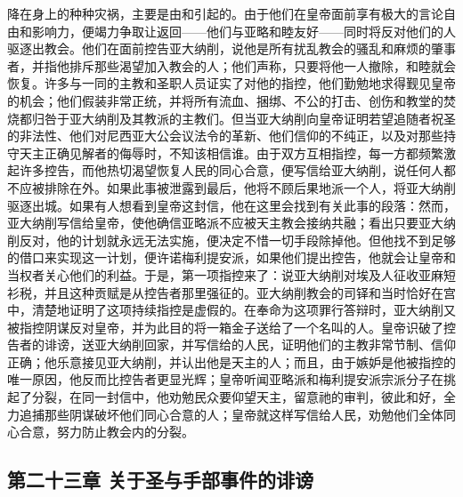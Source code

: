 降在身上的种种灾祸，主要是由和引起的。由于他们在皇帝面前享有极大的言论自由和影响力，便竭力争取让返回——他们与亚略和睦友好——同时将反对他们的人驱逐出教会。他们在面前控告亚大纳削，说他是所有扰乱教会的骚乱和麻烦的肇事者，并指他排斥那些渴望加入教会的人；他们声称，只要将他一人撤除，和睦就会恢复。许多与一同的主教和圣职人员证实了对他的指控，他们勤勉地求得觐见皇帝的机会；他们假装非常正统，并将所有流血、捆绑、不公的打击、创伤和教堂的焚烧都归咎于亚大纳削及其教派的主教们。但当亚大纳削向皇帝证明若望追随者祝圣的非法性、他们对尼西亚大公会议法令的革新、他们信仰的不纯正，以及对那些持守天主正确见解者的侮辱时，不知该相信谁。由于双方互相指控，每一方都频繁激起许多控告，而他热切渴望恢复人民的同心合意，便写信给亚大纳削，说任何人都不应被排除在外。如果此事被泄露到最后，他将不顾后果地派一个人，将亚大纳削驱逐出城。如果有人想看到皇帝这封信，他在这里会找到有关此事的段落：然而，亚大纳削写信给皇帝，使他确信亚略派不应被天主教会接纳共融；看出只要亚大纳削反对，他的计划就永远无法实施，便决定不惜一切手段除掉他。但他找不到足够的借口来实现这一计划，便许诺梅利提安派，如果他们提出控告，他就会让皇帝和当权者关心他们的利益。于是，第一项指控来了：说亚大纳削对埃及人征收亚麻短衫税，并且这种贡赋是从控告者那里强征的。亚大纳削教会的司铎和当时恰好在宫中，清楚地证明了这项持续指控是虚假的。在奉命为这项罪行答辩时，亚大纳削又被指控阴谋反对皇帝，并为此目的将一箱金子送给了一个名叫的人。皇帝识破了控告者的诽谤，送亚大纳削回家，并写信给的人民，证明他们的主教非常节制、信仰正确；他乐意接见亚大纳削，并认出他是天主的人；而且，由于嫉妒是他被指控的唯一原因，他反而比控告者更显光辉；皇帝听闻亚略派和梅利提安派宗派分子在挑起了分裂，在同一封信中，他劝勉民众要仰望天主，留意祂的审判，彼此和好，全力追捕那些阴谋破坏他们同心合意的人；皇帝就这样写信给人民，劝勉他们全体同心合意，努力防止教会内的分裂。\par


\subsection{第二十三章 关于圣与手部事件的诽谤}

